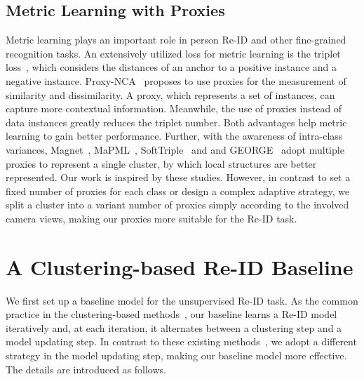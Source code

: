 \documentclass[letterpaper]{article} %
\begin{document}
\subsection{Metric Learning with Proxies}
Metric learning plays an important role in person Re-ID and other fine-grained recognition tasks. An extensively utilized loss for metric learning is the triplet loss~\cite{hermans2017defense}, which considers the distances of an anchor to a positive instance and a negative instance. %
Proxy-NCA~\cite{Attias2017proxy} proposes to use proxies for the measurement of similarity and dissimilarity. A proxy, which represents a set of instances, can capture more contextual information. Meanwhile, the use of proxies instead of data instances greatly reduces the triplet number. Both advantages help metric learning to gain better performance. Further, with the awareness of intra-class variances, Magnet~\cite{Rippel2016multi-center}, MaPML~\cite{Qian2018proxy}, SoftTriple~\cite{qian2019softtriple} and and GEORGE~\cite{sohoni2020no} adopt multiple proxies to represent a single cluster, by which local structures are better represented. %
Our work is inspired by these studies. However, in contrast to set a fixed number of proxies for each class or design a complex adaptive strategy, we split a cluster into a variant number of proxies simply according to the involved camera views, making our proxies more suitable for the Re-ID task.




\section{A Clustering-based Re-ID Baseline}%
\label{sec:baseline}
We first set up a baseline model for the unsupervised Re-ID task. As the common practice in the clustering-based methods~\cite{unsup_clustering,lin2019aBottom,zeng2020hierarchical}, our baseline learns a Re-ID model iteratively and, at each iteration, it alternates between a clustering step and a model updating step. In contrast to these existing methods~\cite{unsup_clustering,lin2019aBottom,zeng2020hierarchical}, we adopt a different strategy in the model updating step, making our baseline model more effective. The details are introduced as follows.
\end{document}
